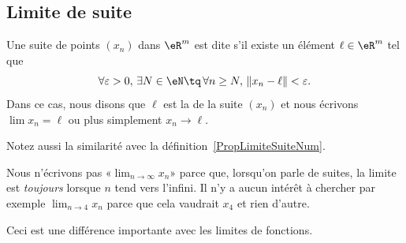 \subsection{Limite de suite}

\begin{definition}
	Une suite de points $(x_n)$ dans $\eR^m$ est dite  s'il existe un élément $\ell\in\eR^m$ tel que
	\begin{equation}	\label{EqCondLimSuite}
		\forall\varepsilon>0,\,\exists N\in \eN\tq\,\forall n\geq N,\,\| x_n-\ell \|<\varepsilon.
	\end{equation}
	Dans ce cas, nous disons que $\ell$ est la  de la suite $(x_n)$ et nous écrivons $\lim x_n=\ell$ ou plus simplement $x_n\to \ell$.
\end{definition}
Notez aussi la similarité avec la définition~\ref{PropLimiteSuiteNum}.

\begin{remark}
	Nous n'écrivons pas «$\lim_{n\to\infty}x_n$» parce que, lorsqu'on parle de suites, la limite est \emph{toujours} lorsque $n$ tend vers l'infini. Il n'y a aucun intérêt à chercher par exemple $\lim_{n\to 4}x_n$ parce que cela vaudrait $x_4$ et rien d'autre.

	Ceci est une différence importante avec les limites de fonctions.
\end{remark}

